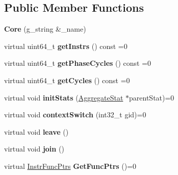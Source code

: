 \subsection*{Public Member Functions}
\begin{DoxyCompactItemize}
\item 
\hypertarget{classCore_ab977c051264daa466362c38f20bf7512}{{\bfseries Core} (g\-\_\-string \&\-\_\-name)}\label{classCore_ab977c051264daa466362c38f20bf7512}

\item 
\hypertarget{classCore_ac3fa041719ceb8c63958eb834eb67c99}{virtual uint64\-\_\-t {\bfseries get\-Instrs} () const =0}\label{classCore_ac3fa041719ceb8c63958eb834eb67c99}

\item 
\hypertarget{classCore_ac47f10ddfe0e591620113e0fe2ae2351}{virtual uint64\-\_\-t {\bfseries get\-Phase\-Cycles} () const =0}\label{classCore_ac47f10ddfe0e591620113e0fe2ae2351}

\item 
\hypertarget{classCore_ac2e4ef43c71b1e50a3cc89d1ec8c58aa}{virtual uint64\-\_\-t {\bfseries get\-Cycles} () const =0}\label{classCore_ac2e4ef43c71b1e50a3cc89d1ec8c58aa}

\item 
\hypertarget{classCore_a093c22041db0e412cf0c84c862676629}{virtual void {\bfseries init\-Stats} (\hyperlink{classAggregateStat}{Aggregate\-Stat} $\ast$parent\-Stat)=0}\label{classCore_a093c22041db0e412cf0c84c862676629}

\item 
\hypertarget{classCore_a9e0d130d0746bed33473dcd8cbc397bb}{virtual void {\bfseries context\-Switch} (int32\-\_\-t gid)=0}\label{classCore_a9e0d130d0746bed33473dcd8cbc397bb}

\item 
\hypertarget{classCore_abf2a30c06a88df1382a7d0cf0da08d2c}{virtual void {\bfseries leave} ()}\label{classCore_abf2a30c06a88df1382a7d0cf0da08d2c}

\item 
\hypertarget{classCore_a2e692b0643767e9abf6b94794cd0c388}{virtual void {\bfseries join} ()}\label{classCore_a2e692b0643767e9abf6b94794cd0c388}

\item 
\hypertarget{classCore_acf1335c8e2215e3e1ff91aa71359f4ec}{virtual \hyperlink{structInstrFuncPtrs}{Instr\-Func\-Ptrs} {\bfseries Get\-Func\-Ptrs} ()=0}\label{classCore_acf1335c8e2215e3e1ff91aa71359f4ec}

\end{DoxyCompactItemize}

